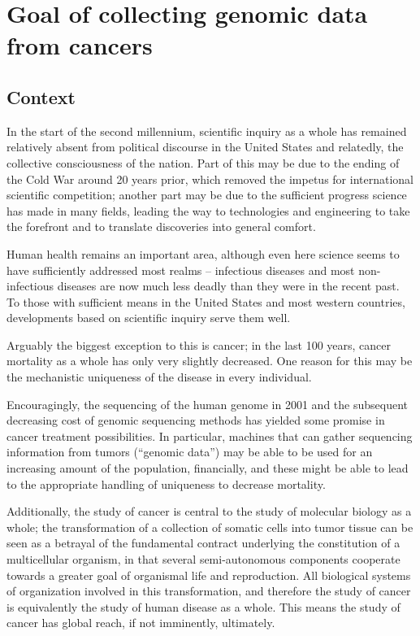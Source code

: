 \chapter{Goal of collecting genomic data from cancers}

\section{Context}
In the start of the second millennium, scientific inquiry as a whole
has remained relatively absent from political discourse in the United
States and relatedly,
the collective consciousness of the nation. Part of this may be due to
the ending of the Cold War around 20 years prior, which removed the
impetus for international scientific competition; another part may be
due to the sufficient progress science has made in many fields,
leading the way to technologies and engineering to take the forefront
and to translate discoveries into general comfort.

Human health remains an important area, although even here science seems to
have sufficiently addressed most realms – infectious diseases and
most non-infectious diseases are now much less deadly than they were
in the recent past. To those with sufficient means in the United
States and most western countries, developments based on scientific
inquiry serve them well.

Arguably the biggest exception to this is cancer; in the last 100
years, cancer mortality as a whole has only very slightly
decreased. One reason for this may be the mechanistic uniqueness of
the disease in every individual.

Encouragingly, the sequencing of the human genome in 2001\cite{lander_initial_2001} and the
subsequent decreasing cost of genomic sequencing methods has yielded
some promise in cancer treatment possibilities. In particular,
machines that can gather sequencing information from tumors (“genomic
data”) may be able to be used for an increasing amount of the
population, financially, and these might be able to lead to the
appropriate handling of uniqueness to decrease mortality.

Additionally, the study of cancer is central to the study of molecular
biology as a whole; the transformation of a collection of somatic
cells into tumor tissue can be seen as a betrayal of the fundamental
contract underlying the constitution of a multicellular organism, in
that several semi-autonomous components cooperate towards a greater
goal of organismal life and reproduction. All biological systems of
organization involved in this transformation, and therefore the study
of cancer is equivalently the study of human disease as a whole. This
means the study of cancer has global reach, if not imminently,
ultimately.



